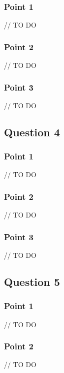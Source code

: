 \subsubsection{Point 1}

// TO DO

\subsubsection{Point 2}

// TO DO

\subsubsection{Point 3}

// TO DO

\subsection{Question 4}

\subsubsection{Point 1}

// TO DO

\subsubsection{Point 2}

// TO DO

\subsubsection{Point 3}

// TO DO

\subsection{Question 5}

\subsubsection{Point 1}

// TO DO

\subsubsection{Point 2}

// TO DO